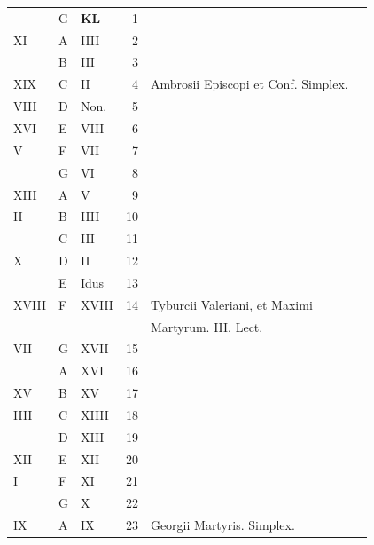 \begin{center}
\begin{tabular}{l | l | l | r | l l}
\color{Red}  & G & \textbf{\color{Red} K\color{Blue}L} & 1 & & \color{Red} \\
\color{Red} XI & \color{Red} A & \color{Red} IIII & 2 & & \color{Red} \\
\color{Red}  & B & \color{Red} III & 3 & \\
\color{Red} XIX & C & \color{Red} II & 4 & Ambrosii Episcopi et Conf. Simplex. \\
\color{Red} VIII & D & \color{Red} Non. & 5 & & \color{Red} \\
\color{Red} XVI & E & \color{Red} VIII & 6 & & \color{Red} \\
\color{Red} V & F & \color{Red} VII & 7 & & \color{Red} \\
\color{Red}  & G & \color{Red} VI & 8 & & \color{Red} \\
\color{Red} XIII & \color{Red} A & \color{Red} V & 9 & & \color{Red} \\
\color{Red} II & B & \color{Red} IIII & 10 & & \color{Red} \\
\color{Red}  & C & \color{Red} III & 11 & & \color{Red} \\
\color{Red} X & D & \color{Red} II & 12 & & \color{Red} \\
\color{Red}  & E & \color{Red} Idus & 13 & & \color{Red} \\
\color{Red} XVIII & F & \color{Red} XVIII & 14 & \multicolumn{2}{l}{Tyburcii Valeriani, et Maximi} \\
 & & & & \quad \color{Red} Martyrum. \color{black} III. Lect. \color{Red} \\
\color{Red} VII & G & \color{Red} XVII & 15 & \\
\color{Red}  & \color{Red} A & \color{Red} XVI & 16 & \\
\color{Red} XV & B & \color{Red} XV & 17 & \\
\color{Red} IIII & C & \color{Red} XIIII & 18 & & \color{Red} \\
\color{Red}  & D & \color{Red} XIII & 19 & & \color{Red} \\
\color{Red} XII & E & \color{Red} XII & 20 & & \color{Red} \\
\color{Red} I & F & \color{Red} XI & 21 & & \color{Red} \\
\color{Red}  & G & \color{Red} X & 22 & & \color{Red} \\
\color{Red} IX & \color{Red} A & \color{Red} IX & 23 & Georgii Martyris. Simplex. & \color{Red} \\

\end{tabular}
\end{center}
